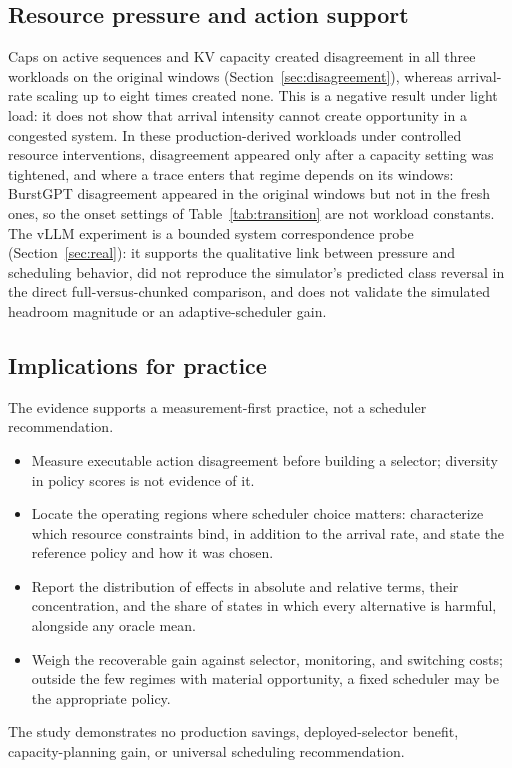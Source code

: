 \documentclass[preprint,12pt]{elsarticle}
\begin{document}
\subsection{Resource pressure and action support}
Caps on active sequences and KV capacity created disagreement in all three
workloads on the original windows (Section~\ref{sec:disagreement}), whereas
arrival-rate scaling up to eight times created none. This is a negative result
under light load: it does not show that arrival intensity cannot create
opportunity in a congested system. In these
production-derived workloads under controlled resource interventions,
disagreement appeared only after a capacity setting was tightened, and where a
trace enters that regime depends on its windows: BurstGPT disagreement appeared
in the original windows but not in the fresh ones, so the onset settings of
Table~\ref{tab:transition} are not workload constants. The vLLM experiment is a
bounded system correspondence probe (Section~\ref{sec:real}): it supports the
qualitative link between pressure and scheduling behavior, did not reproduce
the simulator's predicted class reversal in the direct full-versus-chunked
comparison, and does not validate the simulated headroom magnitude or an
adaptive-scheduler gain.

\subsection{Implications for practice}
The evidence supports a measurement-first practice, not a scheduler
recommendation.
\begin{itemize}
  \item Measure executable action disagreement before building a selector;
  diversity in policy scores is not evidence of it.
  \item Locate the operating regions where scheduler choice matters: characterize
  which resource constraints bind, in addition to the arrival rate, and state the
  reference policy and how it was chosen.
  \item Report the distribution of effects in absolute and relative terms, their
  concentration, and the share of states in which every alternative is harmful,
  alongside any oracle mean.
  \item Weigh the recoverable gain against selector, monitoring, and switching
  costs; outside the few regimes with material opportunity, a fixed scheduler may
  be the appropriate policy.
\end{itemize}
The study demonstrates no production savings, deployed-selector benefit,
capacity-planning gain, or universal scheduling recommendation.
\end{document}
